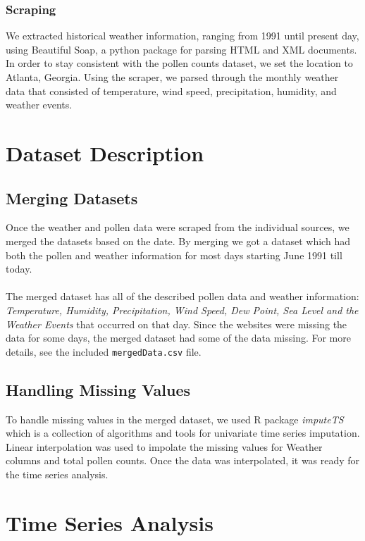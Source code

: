 \documentclass[a4paper,11pt]{article}
\begin{document}
\subsubsection{Scraping}
We extracted historical weather information, ranging from 1991 until present day, using Beautiful Soap, a python package for parsing HTML and XML documents. In order to stay consistent with the pollen counts dataset, we set the location to Atlanta, Georgia. Using the scraper, we parsed through the monthly weather data that consisted of temperature, wind speed, precipitation, humidity, and weather events.

\section{Dataset Description}
\subsection{Merging Datasets}
Once the weather and pollen data were scraped from the individual sources, we merged the datasets based on the date. By merging we got a dataset which had both the pollen and weather information for most days starting June 1991 till today.\\\\
The merged dataset has all of the described pollen data and weather information: \textit{Temperature, Humidity, Precipitation, Wind Speed, Dew Point, Sea Level and the Weather Events} that occurred on that day. Since the websites were missing the data for some days, the merged dataset had some of the data missing. For more details, see the included \texttt{mergedData.csv} file.
\subsection{Handling Missing Values}
To handle missing values in the merged dataset, we used R package \textit{imputeTS} \cite{moritz2015imputets} which is a collection of algorithms and tools for univariate time series imputation. Linear interpolation was used to impolate the missing values for Weather columns and total pollen counts. Once the data was interpolated, it was ready for the time series analysis.

\section{Time Series Analysis}
\end{document}
